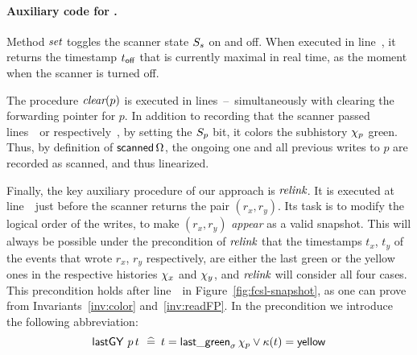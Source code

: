 \paragraph{Auxiliary code for \jyscan.} 
%
Method $\textit{set}$ toggles the scanner state $S_s$ on and off. When
executed in line~\lineScanUnsetsS, it returns the timestamp $t_{\mathsf{off}}$
that is currently maximal in real time, as the moment when the scanner
is turned off.
%

The procedure $\textit{clear}(p)$ is executed in
lines~\lineScanClearsX--\lineScanClearsY~simultaneously with clearing
the forwarding pointer for $p$. In addition to recording that the
scanner passed lines~\lineScanClearsX\ or
respectively~\lineScanClearsY, by setting the $S_p$ bit, it colors
the subhistory $\chi_p$ green. Thus, by definition of
$\mathsf{scanned}\,\Omega$, the ongoing one and all previous writes to
$p$ are recorded as scanned, and thus linearized.

Finally, the key auxiliary procedure of our approach is
$\textit{relink}$. It is executed at line~\lineScanRelinks~just before
the scanner returns the pair $(r_x, r_y)$. Its task is to modify the
logical order of the writes, to make $(r_x, r_y)$ \emph{appear} as a
valid snapshot. This will always be possible under the precondition of
$\textit{relink}$ that the timestamps $t_x$, $t_y$ of the events that
wrote $r_x$, $r_y$ respectively, are either the last green or the
yellow ones in the respective histories $\chi_x$ and $\chi_y$, and
$\textit{relink}$ will consider all four cases.  This precondition holds
after line~\lineScanChoosesRY~in Figure~\ref{fig:fcsl-snapshot}, as
one can prove from Invariants~\ref{inv:color} and~\ref{inv:readFP}. In
the precondition we introduce the following abbreviation:
%
\begin{equation}\label{eq:lgVy}
\mathsf{lastGY}\ p\, t\, \mathrel{\:\widehat{=}\:} t = \mathsf{last\_green}_{\sigma}\,
       \chi_p \vee \kappa(t) = \mathsf{yellow}
\end{equation}
%


